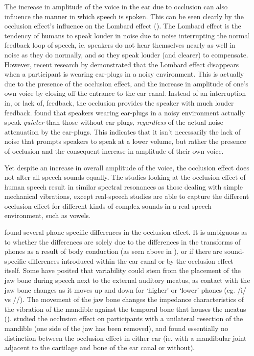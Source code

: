 The increase in amplitude of the voice in the ear due to occlusion can also influence the manner in which speech is spoken.  This can be seen clearly by the occlusion effect's influence on the Lombard effect (\cite{lombard:11,lane:71}).  The Lombard effect is the tendency of humans to speak louder in noise due to noise interrupting the normal feedback loop of speech, ie. speakers do not hear themselves nearly as well in noise as they do normally, and so they speak louder (and clearer) to compensate.  However, recent research by \cite{brungart:12} demonstrated that the Lombard effect disappears when a participant is wearing ear-plugs in a noisy environment.  This is actually due to the presence of the occlusion effect, and the increase in amplitude of one's own voice by closing off the entrance to the ear canal.  Instead of an interruption in, or lack of, feedback, the occlusion provides the speaker with much louder feedback.  \cite{brungart:12} found that speakers wearing ear-plugs in a noisy environment actually speak \textit{quieter} than those without ear-plugs, \textit{regardless} of the actual noise-attenuation by the ear-plugs.  This indicates that it isn't necessarily the lack of noise that prompts speakers to speak at a lower volume, but rather the presence of occlusion and the consequent increase in amplitude of their own voice.

Yet despite an increase in overall amplitude of the voice, the occlusion effect does not alter all speech sounds equally.  The studies looking at the occlusion effect of human speech result in similar spectral resonances as those dealing with simple mechanical vibrations, except real-speech studies are able to capture the different occlusion effect for different kinds of complex sounds in a real speech environment, such as vowels.  



\cite{hansen:97b} found several phone-specific differences in the occlusion effect. It is ambiguous as to whether the differences are solely due to the differences in the transforms of phones as a result of body conduction (as seen above in \cite{reinfeldt:10}), or if there are sound-specific differences introduced within the ear canal or by the occlusion effect itself.  
Some have posited that variability could stem from the placement of the jaw bone during speech next to the external auditory meatus, as contact with the jaw bone changes as it moves up and down for `higher' or `lower' phones (eg. /i/ vs //). The movement of the jaw bone changes the impedance characteristics of the vibration of the mandible against the temporal bone that houses the meatus (\cite{bekesy:60}).  \cite{allen:60} studied the occlusion effect on participants with a unilateral resection of the mandible (one side of the jaw has been removed), and found essentially no distinction between the occlusion effect in either ear (ie. with a mandibular joint adjacent to the cartilage and bone of the ear canal or without).

